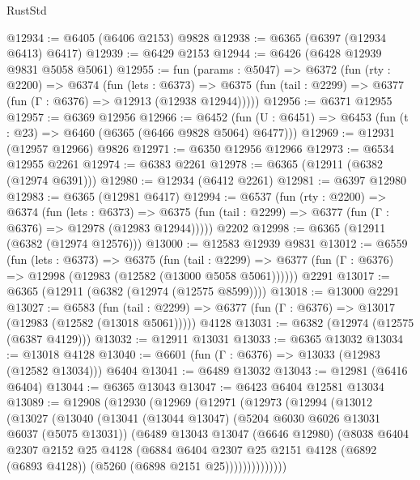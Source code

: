 \begin{lexlean}{RustStd}
\begin{coremodule}
@12934 := @6405 (@6406 @2153) @9828
@12938 := @6365 (@6397 (@12934 @6413) @6417)
@12939 := @6429 @2153
@12944 := @6426 (@6428 @12939 @9831 @5058 @5061)
@12955 := fun (params : @5047) =>
  @6372
    (fun (rty : @2200) =>
    @6374
      (fun (lets : @6373) =>
      @6375 (fun (tail : @2299) => @6377 (fun (Γ : @6376) => @12913 (@12938 @12944)))))
@12956 := @6371 @12955
@12957 := @6369 @12956
@12966 := @6452
    (fun (U : @6451) => @6453 (fun (t : @23) => @6460 (@6365 (@6466 @9828 @5064) @6477)))
@12969 := @12931 (@12957 @12966) @9826
@12971 := @6350 @12956 @12966
@12973 := @6534 @12955 @2261
@12974 := @6383 @2261
@12978 := @6365 (@12911 (@6382 (@12974 @6391)))
@12980 := @12934 (@6412 @2261)
@12981 := @6397 @12980
@12983 := @6365 (@12981 @6417)
@12994 := @6537
    (fun (rty : @2200) =>
    @6374
      (fun (lets : @6373) =>
      @6375 (fun (tail : @2299) => @6377 (fun (Γ : @6376) => @12978 (@12983 @12944)))))
    @2202
@12998 := @6365 (@12911 (@6382 (@12974 @12576)))
@13000 := @12583 @12939 @9831
@13012 := @6559
    (fun (lets : @6373) =>
    @6375
      (fun (tail : @2299) =>
      @6377 (fun (Γ : @6376) => @12998 (@12983 (@12582 (@13000 @5058 @5061))))))
    @2291
@13017 := @6365 (@12911 (@6382 (@12974 (@12575 @8599))))
@13018 := @13000 @2291
@13027 := @6583
    (fun (tail : @2299) => @6377 (fun (Γ : @6376) => @13017 (@12983 (@12582 (@13018 @5061)))))
    @4128
@13031 := @6382 (@12974 (@12575 (@6387 @4129)))
@13032 := @12911 @13031
@13033 := @6365 @13032
@13034 := @13018 @4128
@13040 := @6601 (fun (Γ : @6376) => @13033 (@12983 (@12582 @13034))) @6404
@13041 := @6489 @13032
@13043 := @12981 (@6416 @6404)
@13044 := @6365 @13043
@13047 := @6423 @6404 @12581 @13034
@13089 := @12908
    (@12930
      (@12969
        (@12971
          (@12973
            (@12994
              (@13012
                (@13027
                  (@13040
                    (@13041
                      (@13044 @13047)
                      (@5204 @6030 @6026 @13031 @6037 (@5075 @13031))
                      (@6489
                        @13043
                        @13047
                        (@6646 @12980)
                        (@8038
                          @6404
                          @2307
                          @2152
                          @25
                          @4128
                          (@6884
                            @6404
                            @2307
                            @25
                            @2151
                            @4128
                            (@6892 (@6893 @4128))
                            (@5260 (@6898 @2151 @25))))))))))))))

\end{coremodule}
\end{lexlean}
